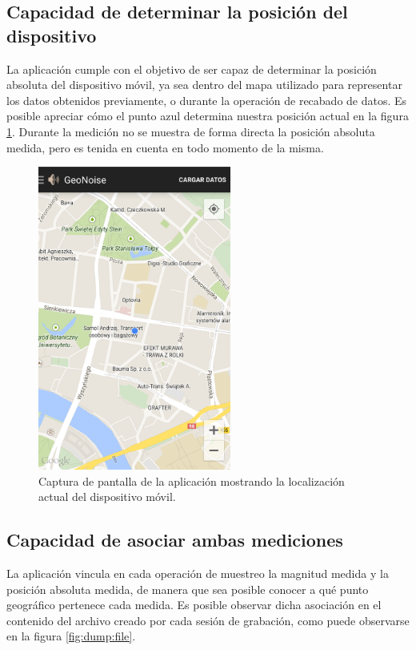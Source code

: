 \subsection{Capacidad de determinar la posición del dispositivo}
La aplicación cumple con el objetivo de ser capaz de determinar la posición absoluta del dispositivo móvil, ya sea dentro del mapa utilizado para representar los datos obtenidos previamente, o durante la operación de recabado de datos. Es posible apreciar cómo el punto azul determina nuestra posición actual en la figura \ref{fig:screen:location}. Durante la medición no se muestra de forma directa la posición absoluta medida, pero es tenida en cuenta en todo momento de la misma.
\begin{figure}[h] \centering
    \includegraphics[height=10cm]{graphs/screen_location.png} \caption{Captura de pantalla de la aplicación mostrando la localización actual del dispositivo móvil.}\label{fig:screen:location}
\end{figure}

\subsection{Capacidad de asociar ambas mediciones}
La aplicación vincula en cada operación de muestreo la magnitud medida y la posición absoluta medida, de manera que sea posible conocer a qué punto geográfico pertenece cada medida. Es posible observar dicha asociación en el contenido del archivo creado por cada sesión de grabación, como puede observarse en la figura \ref{fig:dump:file}.

